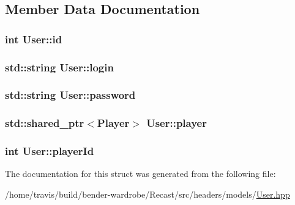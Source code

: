 \subsection{Member Data Documentation}
\hypertarget{struct_user_aa7e6e39b43020bbe9c3a196b3689b0f7}{
\subsubsection[{id}]{\setlength{\rightskip}{0pt plus 5cm}int User\-::id}}\label{struct_user_aa7e6e39b43020bbe9c3a196b3689b0f7}
\hypertarget{struct_user_a68ef4336327a1ee8b4532a6042485f3a}{
\subsubsection[{login}]{\setlength{\rightskip}{0pt plus 5cm}std\-::string User\-::login}}\label{struct_user_a68ef4336327a1ee8b4532a6042485f3a}
\hypertarget{struct_user_ac2f2e75b15e8eb6cbb030fc85a6cd59f}{
\subsubsection[{password}]{\setlength{\rightskip}{0pt plus 5cm}std\-::string User\-::password}}\label{struct_user_ac2f2e75b15e8eb6cbb030fc85a6cd59f}
\hypertarget{struct_user_a55d128918fa7d3e66120d392092227fd}{
\subsubsection[{player}]{\setlength{\rightskip}{0pt plus 5cm}std\-::shared\-\_\-ptr$<${\bf Player}$>$ User\-::player}}\label{struct_user_a55d128918fa7d3e66120d392092227fd}
\hypertarget{struct_user_add1a0a4d41bf6d364738b19f2cee96a6}{
\subsubsection[{player\-Id}]{\setlength{\rightskip}{0pt plus 5cm}int User\-::player\-Id}}\label{struct_user_add1a0a4d41bf6d364738b19f2cee96a6}


The documentation for this struct was generated from the following file\-:\begin{DoxyCompactItemize}
\item 
/home/travis/build/bender-\/wardrobe/\-Recast/src/headers/models/\hyperlink{_user_8hpp}{User.\-hpp}\end{DoxyCompactItemize}
